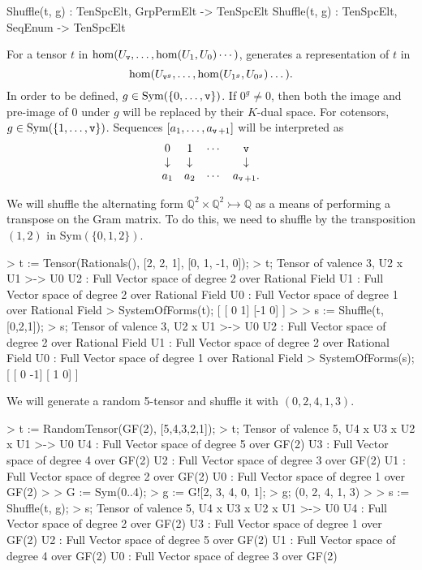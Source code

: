 \begin{intrinsics}
Shuffle(t, g) : TenSpcElt, GrpPermElt -> TenSpcElt
Shuffle(t, g) : TenSpcElt, SeqEnum -> TenSpcElt
\end{intrinsics}

For a tensor $t$ in $\hom(U_{\operatorname{\mathtt{v}}},\dots,\hom(U_1,U_0)\cdots)$, 
generates a representation of $t$ in 
\[ \hom(U_{{\operatorname{\mathtt{v}}}^g},\dots,\hom(U_{1^g},U_{0^g})\dots). \]
In order to be defined, $g\in\text{Sym}(\{0,\dots,\operatorname{\mathtt{v}} \})$. 
If $0^g\ne 0$, then both the image and pre-image of $0$ under $g$ will be replaced by their $K$-dual space.
For cotensors, $g\in\text{Sym}(\{1,\dots,\operatorname{\mathtt{v}}\})$.
Sequences $[a_1,\dots,a_{\operatorname{\mathtt{v}}+1}]$ will be interpreted as 
\[ 
    \begin{array}{cccc} 
        0 & 1 & \cdots & \operatorname{\mathtt{v}} \\ 
    \downarrow & \downarrow & & \downarrow \\ 
    a_1 & a_2 & \cdots & a_{\operatorname{\mathtt{v}}+1}. 
    \end{array}
\]

\begin{example}[ShuffleToTranspose]

We will shuffle the alternating form
$\mathbb{Q}^2\times\mathbb{Q}^2\rightarrowtail \mathbb{Q}$ as a means of
performing a transpose on the Gram matrix. To do this, we need to shuffle by the
transposition $(1, 2)$ in Sym$(\{0,1,2\})$. 
\begin{code}
> t := Tensor(Rationals(), [2, 2, 1], [0, 1, -1, 0]);
> t;
Tensor of valence 3, U2 x U1 >-> U0
U2 : Full Vector space of degree 2 over Rational Field
U1 : Full Vector space of degree 2 over Rational Field
U0 : Full Vector space of degree 1 over Rational Field
> SystemOfForms(t);
[
    [ 0  1]
    [-1  0]
]
> 
> s := Shuffle(t, [0,2,1]);
> s;
Tensor of valence 3, U2 x U1 >-> U0
U2 : Full Vector space of degree 2 over Rational Field
U1 : Full Vector space of degree 2 over Rational Field
U0 : Full Vector space of degree 1 over Rational Field
> SystemOfForms(s);
[
    [ 0 -1]
    [ 1  0]
]
\end{code}
\end{example}

\begin{example}[Shuffling]

We will generate a random 5-tensor and shuffle it with $(0,2,4,1,3)$.
\begin{code}
> t := RandomTensor(GF(2), [5,4,3,2,1]);
> t;
Tensor of valence 5, U4 x U3 x U2 x U1 >-> U0
U4 : Full Vector space of degree 5 over GF(2)
U3 : Full Vector space of degree 4 over GF(2)
U2 : Full Vector space of degree 3 over GF(2)
U1 : Full Vector space of degree 2 over GF(2)
U0 : Full Vector space of degree 1 over GF(2)
> 
> G := Sym({0..4});
> g := G![2, 3, 4, 0, 1];
> g;
(0, 2, 4, 1, 3)
> 
> s := Shuffle(t, g);
> s;
Tensor of valence 5, U4 x U3 x U2 x U1 >-> U0
U4 : Full Vector space of degree 2 over GF(2)
U3 : Full Vector space of degree 1 over GF(2)
U2 : Full Vector space of degree 5 over GF(2)
U1 : Full Vector space of degree 4 over GF(2)
U0 : Full Vector space of degree 3 over GF(2)
\end{code}
\end{example}


